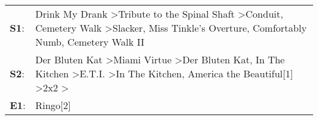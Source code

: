 \begin{supertabular}{p{0.03\textwidth}p{0.92\textwidth}}
 \textbf{S1}:  &                                                  Drink My Drank\textsuperscript{} \textgreater \enspace Tribute to the Spinal Shaft\textsuperscript{} \textgreater \enspace Conduit\textsuperscript{}, \enspace Cemetery Walk\textsuperscript{} \textgreater \enspace Slacker\textsuperscript{}, \enspace Miss Tinkle's Overture\textsuperscript{}, \enspace Comfortably Numb\textsuperscript{}, \enspace Cemetery Walk II\textsuperscript{}  \enspace  \\
 \textbf{S2}:  &  Der Bluten Kat\textsuperscript{} \textgreater \enspace Miami Virtue\textsuperscript{} \textgreater \enspace Der Bluten Kat\textsuperscript{}, \enspace In The Kitchen\textsuperscript{} \textgreater \enspace E.T.I.\textsuperscript{} \textgreater \enspace In The Kitchen\textsuperscript{}, \enspace America the Beautiful[1]\textsuperscript{} \textgreater \enspace 2x2\textsuperscript{} \textgreater {}\textsuperscript{}  \enspace  \\
 \textbf{E1}:  &                                                                                                                                                                                                                                                                                                                                                                                                                   Ringo[2]\textsuperscript{}  \enspace  \\
\end{supertabular}
